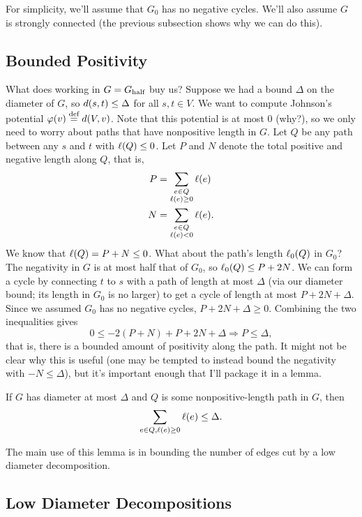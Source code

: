 \documentclass[12pt]{article}
\begin{document}
For simplicity, we'll assume that $G_0$ has no negative cycles. We'll also
assume $G$ is strongly connected (the previous subsection shows why we can do
this).

\subsection{Bounded Positivity}

What does working in $G = G_{\text{half}}$ buy us? Suppose we had a bound $\Delta$ on
the diameter of $G$, so $\dist{s, t} \leq \Delta$ for all $s, t \in V$. We want
to compute Johnson's potential $\varphi(v) \defeq \dist{V, v}$. Note that this
potential is at most $0$ (why?), so we only need to worry about paths that have
nonpositive length in $G$. Let $Q$ be any path between any $s$ and $t$ with
$\len{Q} \leq 0$. Let $P$ and $N$ denote the total positive and negative length
along $Q$, that is,
\begin{align*}
  P & = \sum_{\substack{e \in Q \\ \len{e} \geq 0}} \len{e} \\
  N & = \sum_{\substack{e \in Q \\ \len{e}<0}} \len{e}.
\end{align*}
We know that $\len{Q} = P + N \leq 0$. What about the path's length $\len_0(Q)$
in $G_0$? The negativity in $G$ is at most half that of $G_0$, so
$\len_0(Q) \leq P + 2N$. We can form a cycle by connecting $t$ to $s$ with a
path of length at most $\Delta$ (via our diameter bound; its length in $G_0$ is
no larger) to get a cycle of length at most $P + 2N + \Delta$. Since we assumed
$G_0$ has no negative cycles, $P + 2N + \Delta \geq 0$. Combining the two
inequalities gives
\[
  0 \leq -2(P + N) + P + 2N + \Delta \Longrightarrow P \leq \Delta,
\]
that is, there is a bounded amount of positivity along the path. It might not be
clear why this is useful (one may be tempted to instead bound the negativity
with $-N \leq \Delta$), but it's important enough that I'll package it in a
lemma.

\begin{lemma}
  \label{lemma:bounded-positivity}
  If $G$ has diameter at most $\Delta$ and $Q$ is some nonpositive-length path
  in $G$, then
  \[
    \sum_{e \in Q, \len{e} \geq 0} \len{e} \leq \Delta.
  \]
\end{lemma}

The main use of this lemma is in bounding the number of edges cut by a low
diameter decomposition.

\subsection{Low Diameter Decompositions}
\end{document}
